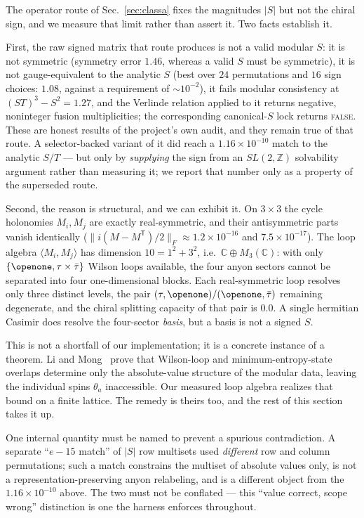 \documentclass[aps,pra,twocolumn,superscriptaddress,longbibliography,floatfix,nofootinbib]{revtex4-2}
\newcommand{\Id}{\openone}
\newcommand{\Fnorm}[1]{\lVert #1 \rVert_{F}}
\begin{document}
The operator route of Sec.~\ref{sec:classa} fixes the magnitudes $|S|$ but not
the chiral sign, and we measure that limit rather than assert it. Two facts
establish it.

First, the raw signed matrix that route produces is not a valid modular $S$: it
is not symmetric (symmetry error $1.46$, whereas a valid $S$ must be
symmetric), it is not gauge-equivalent to the analytic $S$ (best over $24$
permutations and $16$ sign choices: $1.08$, against a requirement of
${\sim}10^{-2}$), it fails modular consistency at $(ST)^{3}-S^{2}=1.27$, and the
Verlinde relation applied to it returns negative, noninteger fusion
multiplicities; the corresponding canonical-$S$ lock returns \textsc{false}.
These are honest results of the project's own audit, and they remain true of
that route. A selector-backed variant of it did reach a $1.16\times10^{-10}$
match to the analytic $S/T$ --- but only by \emph{supplying} the sign from an
$SL(2,\mathbb{Z})$ solvability argument rather than measuring it; we report that
number only as a property of the superseded route.

Second, the reason is structural, and we can exhibit it. On $3\times3$ the cycle
holonomies $M_i,M_j$ are exactly real-symmetric, and their antisymmetric parts
vanish identically ($\Fnorm{i(M-M^{\mathsf T})/2} \approx 1.2\times10^{-16}$
and $7.5\times10^{-17}$). The loop algebra $\langle M_i,M_j\rangle$ has
dimension $10=1^{2}+3^{2}$, i.e.\ $\mathbb{C}\oplus M_3(\mathbb{C})$: with only
$\{\Id,\tau\times\bar\tau\}$ Wilson loops available, the four anyon sectors
cannot be separated into four one-dimensional blocks. Each real-symmetric loop
resolves only three distinct levels, the pair $(\tau,\Id)/(\Id,\bar\tau)$
remaining degenerate, and the chiral splitting capacity of that pair is $0.0$. A
single hermitian Casimir does resolve the four-sector \emph{basis}, but a basis
is not a signed $S$.

This is not a shortfall of our implementation; it is a concrete instance of a
theorem. Li and Mong~\cite{LiMong2022} prove that Wilson-loop and
minimum-entropy-state overlaps determine only the absolute-value structure of
the modular data, leaving the individual spins $\theta_a$ inaccessible. Our
measured loop algebra realizes that bound on a finite lattice. The remedy is
theirs too, and the rest of this section takes it up.

One internal quantity must be named to prevent a spurious contradiction. A
separate ``$e{-}15$ match'' of $|S|$ row multisets used \emph{different} row and
column permutations; such a match constrains the multiset of absolute values
only, is not a representation-preserving anyon relabeling, and is a different
object from the $1.16\times10^{-10}$ above. The two must not be conflated ---
this ``value correct, scope wrong'' distinction is one the harness enforces
throughout.
\end{document}
